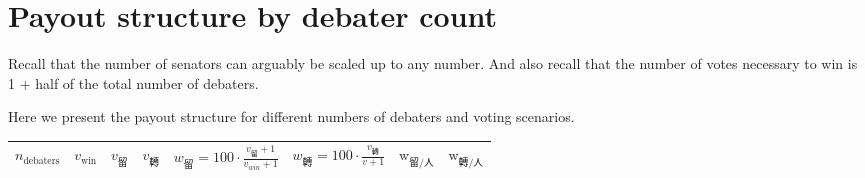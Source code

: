     



\section{Payout structure by debater count}
Recall that the number of senators can arguably be scaled up to any number. And also recall that the number of votes necessary to win is 1 + half of the total number of debaters.

Here we present the payout structure for different numbers of debaters and voting scenarios.


\begin{table}[H]
    \centering
    \small
    \begin{threeparttable}
    \begin{tabular}{cccccccc}    
    \toprule
    $n_{\text{debaters}}$ & $v_{\text{win}}$ & $v_{\text{留}}$ & $v_{\text{轉}}$ & $w_{\text{留}} = 100 \cdot \frac{v_{\text{留}}+1}{v_{win}+1} $ & $w_{\text{轉}} = 100\cdot\frac{v_{\text{轉}}}{v+1}$ & $\text{w}_{\text{留}/\text{人} }$ & $\text{w}_{\text{轉}/\text{人}}$ \\
    \midrule


\end{tabular}
\end{threeparttable}
\end{table}
